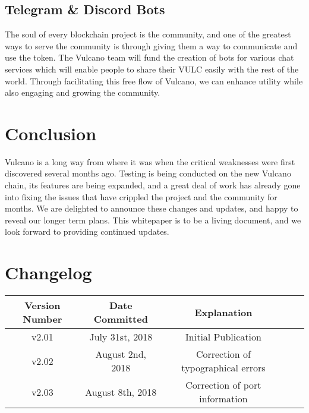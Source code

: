 \documentclass[A4paper, 12pt]{article}
\begin{document}
\subsection{Telegram \& Discord Bots}
The soul of every blockchain project is the community, and one of the greatest ways to serve the community is through giving them a way to communicate and use the token. The Vulcano team will fund the creation of bots for various chat services which will enable people to share their VULC easily with the rest of the world. Through facilitating this free flow of Vulcano, we can enhance utility while also engaging and growing the community.

\section{Conclusion}
Vulcano is a long way from where it was when the critical weaknesses were first discovered several months ago. Testing is being conducted on the new Vulcano chain, its features are being expanded, and a great deal of work has already gone into fixing the issues that have crippled the project and the community for months. We are delighted to announce these changes and updates, and happy to reveal our longer term plans. This whitepaper is to be a living document, and we look forward to providing continued updates. 
\newpage
\section{Changelog}

\begin{table}[h]
\centering
\begin{tabular}{@{}ccccc@{}}
\toprule
Version Number & Date Committed & Explanation \\ \midrule
v2.01 & July 31st, 2018 & Initial Publication \\
v2.02 & August 2nd, 2018 & Correction of typographical errors \\
v2.03 & August 8th, 2018 & Correction of port information \\
 \bottomrule
\end{tabular}
\end{table}
\end{document}
